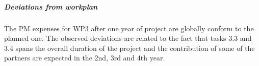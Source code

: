 \subparagraph{Deviations from workplan}  

The PM expenses for WP3 after one year of project are globally conform to the planned one. The observed deviations are related to the fact that tasks 3.3 and 3.4 spans the overall duration of the project and the contribution of some of the partners are expected in the 2nd, 3rd and 4th year.





